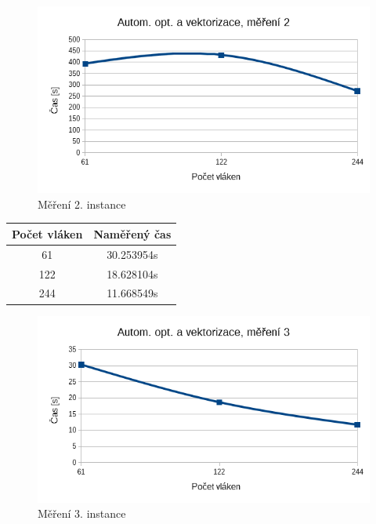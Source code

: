 \documentclass[12pt]{article}
\begin{document}
\begin{figure}[H]
  \begin{center}
      \includegraphics[width=12cm]{images/phi2.png}	
    \caption{Měření 2. instance} 
  \end{center}
\end{figure}

%
%
\begin{center}
\begin{tabular}{ c | c }
\textbf{Počet vláken} & \textbf{Naměřený čas} \\ \hline \hline 
61 & 30.253954s \\ \hline
122 & 18.628104s \\ \hline
244 & 11.668549s \\ \hline
\end{tabular}
\end{center}

\begin{figure}[H]
  \begin{center}
      \includegraphics[width=12cm]{images/phi3.png}	
    \caption{Měření 3. instance} 
  \end{center}
\end{figure}
\end{document}
